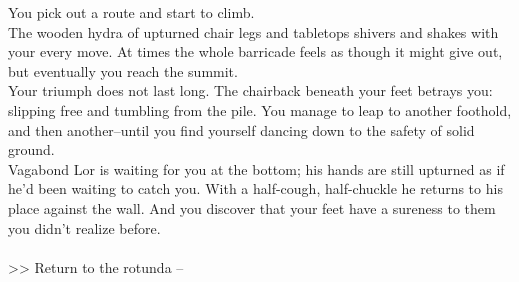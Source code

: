You pick out a route and start to climb.\\

The wooden hydra of upturned chair legs and tabletops shivers and shakes with your every move. At times the whole barricade feels as though it might give out, but eventually you reach the summit.\\

Your triumph does not last long. The chairback beneath your feet betrays you: slipping free and tumbling from the pile. You manage to leap to another foothold, and then another--until you find yourself dancing down to the safety of solid ground.\\

Vagabond Lor is waiting for you at the bottom; his hands are still upturned as if he'd been waiting to catch you. With a half-cough, half-chuckle he returns to his place against the wall. And you discover that your feet have a sureness to them you didn't realize before.\\
\\

>> Return to the rotunda -- 